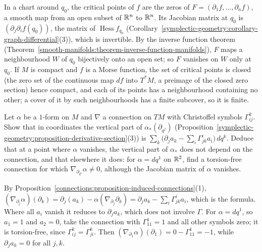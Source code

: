 \begin{solution}
In a chart around $q_0$, the critical points of $f$ are the zeros of $F = (\partial_1f, \ldots, \partial_nf)$, a smooth map from an open subset of $\mathbb{R}^n$ to $\mathbb{R}^n$. Its Jacobian matrix at $q_0$ is
$(\partial_j\partial_if(q_0))$, the matrix of $\operatorname{Hess}f_{q_0}$ (Corollary~\ref{symplectic-geometry:corollary-graph-differential}(3)), which is invertible. By the inverse function theorem
(Theorem~\ref{smooth-manifolds:theorem-inverse-function-manifolds}), $F$ maps a neighbourhood $W$ of $q_0$ bijectively onto an open set; so $F$ vanishes on $W$ only at $q_0$. If $M$ is compact and $f$ is a
Morse function, the set of critical points is closed (the zero set of the continuous map $df$ into $T^*M$, a preimage of the closed zero section) hence compact, and each of its points has a
neighbourhood containing no other; a cover of it by such neighbourhoods has a finite subcover, so it is finite.
\end{solution}

\begin{exercise}\label{symplectic-geometry:exercise-derivative-section-connection}
Let $\alpha$ be a $1$-form on $M$ and $\nabla$ a connection on $TM$ with Christoffel symbols $\Gamma^k_{ij}$. Show that in coordinates the vertical part of $\alpha_*(\partial_{q^j})$
(Proposition~\ref{symplectic-geometry:proposition-derivative-section}(3)) is $\sum_k\bigl(\partial_ja_k - \sum_i\Gamma^i_{jk}a_i\bigr)\,dq^k$. Deduce that at a point where $\alpha$ vanishes, the vertical part
of $\alpha_*$ does not depend on the connection, and that elsewhere it does: for $\alpha = dq^1$ on $\mathbb{R}^2$, find a torsion-free connection for which $\nabla_{\partial_{q^1}}\alpha \neq 0$, although the
Jacobian matrix of $\alpha$ vanishes.
\end{exercise}

\begin{solution}
By Proposition~\ref{connections:proposition-induced-connections}(1), $(\nabla_{\partial_j}\alpha)(\partial_k) = \partial_j(a_k) - \alpha(\nabla_{\partial_j}\partial_k) = \partial_ja_k - \sum_i\Gamma^i_{jk}a_i$, which is the
formula. Where all $a_i$ vanish it reduces to $\partial_ja_k$, which does not involve $\Gamma$. For $\alpha = dq^1$, so $a_1 = 1$ and $a_2 = 0$, take the connection with $\Gamma^1_{11} = 1$ and all other
symbols zero; it is torsion-free, since $\Gamma^k_{ij} = \Gamma^k_{ji}$. Then $(\nabla_{\partial_1}\alpha)(\partial_1) = 0 - \Gamma^1_{11} = -1$, while $\partial_ja_k = 0$ for all $j, k$.
\end{solution}

